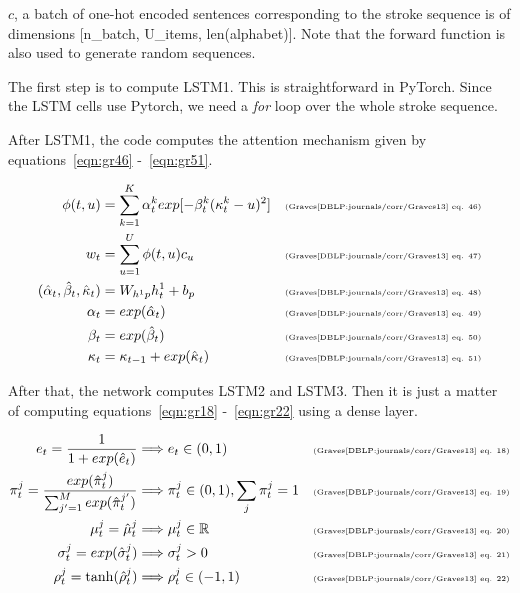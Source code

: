 \documentclass{article}
\begin{document}
$c$, a batch of one-hot encoded sentences corresponding to the stroke sequence is of dimensions [n\_batch, U\_items, len(alphabet)]. Note that the forward function is also used to generate random sequences.

The first step is to compute LSTM1. This is straightforward in PyTorch. Since the LSTM cells use Pytorch, we need a \textit{for} loop over the whole stroke sequence.

After LSTM1, the code computes the attention mechanism given by equations~\ref{eqn:gr46} -~\ref{eqn:gr51}.

    \begin{align}
        \label{eqn:gr46} \phi(t,u) &= \sum_{k=1}^K\alpha_t^kexp[-\beta_t^k(\kappa_t^k-u)^2] & \text{\tiny{(Graves\cite{DBLP:journals/corr/Graves13} eq. 46)}} \\
        \label{eqn:gr47} w_t &= \sum_{u=1}^U\phi(t,u)c_u & \text{\tiny{(Graves\cite{DBLP:journals/corr/Graves13} eq. 47)}} \\
        \label{eqn:gr48} (\hat{\alpha}_t,\hat{\beta}_t,\hat{\kappa}_t) &= W_{h^1p}h_t^1 + b_p & \text{\tiny{(Graves\cite{DBLP:journals/corr/Graves13} eq. 48)}} \\
        \label{eqn:gr49} \alpha_t &= exp(\hat{\alpha}_t) & \text{\tiny{(Graves\cite{DBLP:journals/corr/Graves13} eq. 49)}} \\
        \label{eqn:gr50} \beta_t &= exp(\hat{\beta}_t) & \text{\tiny{(Graves\cite{DBLP:journals/corr/Graves13} eq. 50)}} \\
        \label{eqn:gr51} \kappa_t &= \kappa_{t-1} + exp(\hat{\kappa}_t) & \text{\tiny{(Graves\cite{DBLP:journals/corr/Graves13} eq. 51)}}
    \end{align}  
    
After that, the network computes LSTM2 and LSTM3. Then it is just a matter of computing equations~\ref{eqn:gr18} -~\ref{eqn:gr22} using a dense layer.

    \begin{align}
        \label{eqn:gr18} e_t = \frac{1}{1+exp(\hat{e}_t)} & \Longrightarrow e_t\in(0,1) & \text{\tiny{(Graves\cite{DBLP:journals/corr/Graves13} eq. 18)}} \\
        \label{eqn:gr19} \pi_t^j = \frac{exp(\hat{\pi}_t^j)}{\sum_{j'=1}^Mexp(\hat{\pi}_t^{j'})} & \Longrightarrow \pi_t^j\in(0,1), \sum_{j}\pi_t^j=1 & \text{\tiny{(Graves\cite{DBLP:journals/corr/Graves13} eq. 19)}} \\
        \label{eqn:gr20} \mu_t^j = \hat{\mu}_t^j & \Longrightarrow \mu_t^j\in\mathbb{R} & \text{\tiny{(Graves\cite{DBLP:journals/corr/Graves13} eq. 20)}} \\
        \label{eqn:gr21} \sigma_t^j = exp(\hat{\sigma}_t^j) & \Longrightarrow \sigma_t^j>0 & \text{\tiny{(Graves\cite{DBLP:journals/corr/Graves13} eq. 21)}} \\
        \label{eqn:gr22} \rho_t^j = \tanh(\hat{\rho}_t^j) & \Longrightarrow \rho_t^j\in(-1,1) & \text{\tiny{(Graves\cite{DBLP:journals/corr/Graves13} eq. 22)}}
    \end{align}  
    
\end{document}
